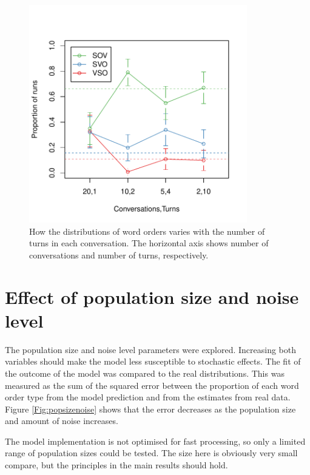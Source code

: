 \documentclass[12pt]{article}
\begin{document}
\begin{figure}[htbp]
\begin{center}
\includegraphics[width=95mm]{../images/pdf/ConvTurns.pdf}
\caption{How the distributions of word orders varies with the number of turns in each conversation.  The horizontal axis shows number of conversations and number of turns, respectively.}
\label{fig:ConvTurns}
\end{center}
\end{figure}

\clearpage
\newpage

\section{Effect of population size and noise level}

The population size and noise level parameters were explored.  Increasing both variables should make the model less susceptible to stochastic effects.  The fit of the outcome of the model was compared to the real distributions.  This was measured as the sum of the squared error between the proportion of each word order type from the model prediction and from the estimates from real data.  Figure \ref{Fig:popsizenoise} shows that the error decreases as the population size and amount of noise increases.  

The model implementation is not optimised for fast processing, so only a limited range of population sizes could be tested.  The size here is obviously very small compare, but the principles in the main results should hold.
\end{document}
